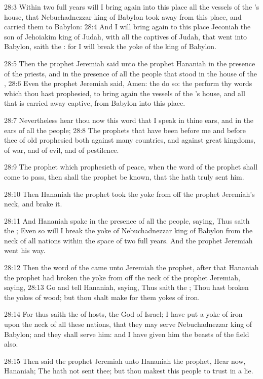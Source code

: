 28:3 Within two full years will I bring again into this place all the vessels of the \LORD's house, that Nebuchadnezzar king of Babylon took away from this place, and carried them to Babylon: 28:4 And I will bring again to this place Jeconiah the son of Jehoiakim king of Judah, with all the captives of Judah, that went into Babylon, saith the \LORD: for I will break the yoke of the king of Babylon.

28:5 Then the prophet Jeremiah said unto the prophet Hananiah in the presence of the priests, and in the presence of all the people that stood in the house of the \LORD, 28:6 Even the prophet Jeremiah said, Amen: the \LORD do so: the \LORD perform thy words which thou hast prophesied, to bring again the vessels of the \LORD's house, and all that is carried away captive, from Babylon into this place.

28:7 Nevertheless hear thou now this word that I speak in thine ears, and in the ears of all the people; 28:8 The prophets that have been before me and before thee of old prophesied both against many countries, and against great kingdoms, of war, and of evil, and of pestilence.

28:9 The prophet which prophesieth of peace, when the word of the prophet shall come to pass, then shall the prophet be known, that the \LORD hath truly sent him.

28:10 Then Hananiah the prophet took the yoke from off the prophet Jeremiah's neck, and brake it.

28:11 And Hananiah spake in the presence of all the people, saying, Thus saith the \LORD; Even so will I break the yoke of Nebuchadnezzar king of Babylon from the neck of all nations within the space of two full years. And the prophet Jeremiah went his way.

28:12 Then the word of the \LORD came unto Jeremiah the prophet, after that Hananiah the prophet had broken the yoke from off the neck of the prophet Jeremiah, saying, 28:13 Go and tell Hananiah, saying, Thus saith the \LORD; Thou hast broken the yokes of wood; but thou shalt make for them yokes of iron.

28:14 For thus saith the \LORD of hosts, the God of Israel; I have put a yoke of iron upon the neck of all these nations, that they may serve Nebuchadnezzar king of Babylon; and they shall serve him: and I have given him the beasts of the field also.

28:15 Then said the prophet Jeremiah unto Hananiah the prophet, Hear now, Hananiah; The \LORD hath not sent thee; but thou makest this people to trust in a lie.

